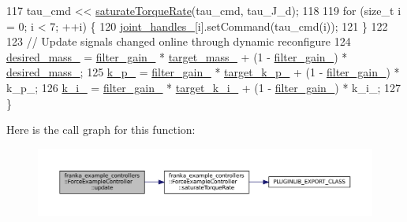\begin{DoxyCode}
117   tau\_cmd << \hyperlink{classfranka__example__controllers_1_1ForceExampleController_ac00e2f9f34f52e96a61e9d694e09fbd7}{saturateTorqueRate}(tau\_cmd, tau\_J\_d);
118 
119   \textcolor{keywordflow}{for} (\textcolor{keywordtype}{size\_t} i = 0; i < 7; ++i) \{
120     \hyperlink{classfranka__example__controllers_1_1ForceExampleController_aed2074f77427deafe9b8670430f5a760}{joint\_handles\_}[i].setCommand(tau\_cmd(i));
121   \}
122 
123   \textcolor{comment}{// Update signals changed online through dynamic reconfigure}
124   \hyperlink{classfranka__example__controllers_1_1ForceExampleController_a5141239dda158063dc67d47aa74c2a3e}{desired\_mass\_} = \hyperlink{classfranka__example__controllers_1_1ForceExampleController_a213ed677004316d1b790794f03aa0a7a}{filter\_gain\_} * \hyperlink{classfranka__example__controllers_1_1ForceExampleController_a351793b041d57afb712be67410821cdc}{target\_mass\_} + (1 - 
      \hyperlink{classfranka__example__controllers_1_1ForceExampleController_a213ed677004316d1b790794f03aa0a7a}{filter\_gain\_}) * \hyperlink{classfranka__example__controllers_1_1ForceExampleController_a5141239dda158063dc67d47aa74c2a3e}{desired\_mass\_};
125   \hyperlink{classfranka__example__controllers_1_1ForceExampleController_a2f3c9fae22264a5a80da0d00e617bdf1}{k\_p\_} = \hyperlink{classfranka__example__controllers_1_1ForceExampleController_a213ed677004316d1b790794f03aa0a7a}{filter\_gain\_} * \hyperlink{classfranka__example__controllers_1_1ForceExampleController_ae5b17c481b7c7acebb8f378e29bf6b77}{target\_k\_p\_} + (1 - 
      \hyperlink{classfranka__example__controllers_1_1ForceExampleController_a213ed677004316d1b790794f03aa0a7a}{filter\_gain\_}) * k\_p\_;
126   \hyperlink{classfranka__example__controllers_1_1ForceExampleController_a1a120dff4babea15e1d5a866547cd13a}{k\_i\_} = \hyperlink{classfranka__example__controllers_1_1ForceExampleController_a213ed677004316d1b790794f03aa0a7a}{filter\_gain\_} * \hyperlink{classfranka__example__controllers_1_1ForceExampleController_ae4636481a611830a438a2b49ccb05f17}{target\_k\_i\_} + (1 - 
      \hyperlink{classfranka__example__controllers_1_1ForceExampleController_a213ed677004316d1b790794f03aa0a7a}{filter\_gain\_}) * k\_i\_;
127 \}
\end{DoxyCode}
Here is the call graph for this function\+:
\nopagebreak
\begin{figure}[H]
\begin{center}
\leavevmode
\includegraphics[width=350pt]{classfranka__example__controllers_1_1ForceExampleController_ae15ee13e9cb72653edb468127e65fa3c_cgraph}
\end{center}
\end{figure}


